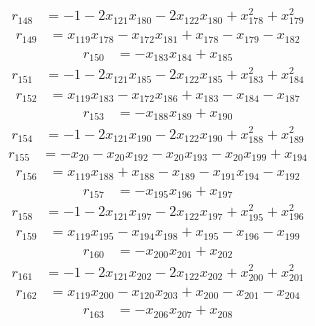 \begin{align*}
r_{148}&=
-1-2x_{121}x_{180}-2x_{122}x_{180}+x_{178}^{2}+x_{179}^{2}
\end{align*}
\begin{align*}
r_{149}&=
x_{119}x_{178}-x_{172}x_{181}+x_{178}-x_{179}-x_{182}
\end{align*}
\begin{align*}
r_{150}&=
-x_{183}x_{184}+x_{185}
\end{align*}
\begin{align*}
r_{151}&=
-1-2x_{121}x_{185}-2x_{122}x_{185}+x_{183}^{2}+x_{184}^{2}
\end{align*}
\begin{align*}
r_{152}&=
x_{119}x_{183}-x_{172}x_{186}+x_{183}-x_{184}-x_{187}
\end{align*}
\begin{align*}
r_{153}&=
-x_{188}x_{189}+x_{190}
\end{align*}
\begin{align*}
r_{154}&=
-1-2x_{121}x_{190}-2x_{122}x_{190}+x_{188}^{2}+x_{189}^{2}
\end{align*}
\begin{align*}
r_{155}&=
-x_{20}-x_{20}x_{192}-x_{20}x_{193}-x_{20}x_{199}+x_{194}
\end{align*}
\begin{align*}
r_{156}&=
x_{119}x_{188}+x_{188}-x_{189}-x_{191}x_{194}-x_{192}
\end{align*}
\begin{align*}
r_{157}&=
-x_{195}x_{196}+x_{197}
\end{align*}
\begin{align*}
r_{158}&=
-1-2x_{121}x_{197}-2x_{122}x_{197}+x_{195}^{2}+x_{196}^{2}
\end{align*}
\begin{align*}
r_{159}&=
x_{119}x_{195}-x_{194}x_{198}+x_{195}-x_{196}-x_{199}
\end{align*}
\begin{align*}
r_{160}&=
-x_{200}x_{201}+x_{202}
\end{align*}
\begin{align*}
r_{161}&=
-1-2x_{121}x_{202}-2x_{122}x_{202}+x_{200}^{2}+x_{201}^{2}
\end{align*}
\begin{align*}
r_{162}&=
x_{119}x_{200}-x_{120}x_{203}+x_{200}-x_{201}-x_{204}
\end{align*}
\begin{align*}
r_{163}&=
-x_{206}x_{207}+x_{208}
\end{align*}

